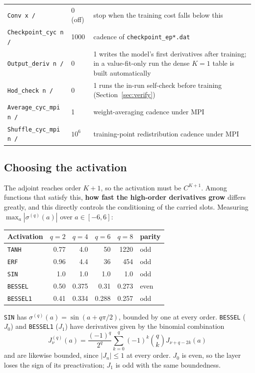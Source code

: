 \documentclass[10pt,a4paper]{article}
\newcommand{\code}[1]{\texttt{#1}}
\begin{document}
\begin{longtable}{@{}p{}p{}p{}@{}}
\code{Conv x /} & 0 (off) & stop when the training cost falls below this\\
\code{Checkpoint\_cyc n /} & 1000 & cadence of \code{checkpoint\_ep*.dat}\\
\code{Output\_deriv n /} & 0 & 1 writes the model's first derivatives after training; in a value-fit-only run the dense $K=1$ table is built automatically\\
\code{Hod\_check n /} & 0 & 1 runs the in-run self-check before training (Section~\ref{sec:verify})\\
\code{Average\_cyc\_mpi n /} & 1 & weight-averaging cadence under MPI\\
\code{Shuffle\_cyc\_mpi n /} & $10^6$ & training-point redistribution cadence under MPI\\
\bottomrule
\end{longtable}

\subsection{Choosing the activation}
\label{sec:activation}

The adjoint reaches order $K+1$, so the activation must be
$C^{K+1}$. Among functions that satisfy this, \textbf{how fast the
high-order derivatives grow} differs greatly, and this directly
controls the conditioning of the carried slots. Measuring
$\max_a|\sigma^{(q)}(a)|$ over $a\in[-6,6]$:

\begin{center}
\begin{tabular}{@{}lrrrrl@{}}
\toprule
Activation & $q=2$ & $q=4$ & $q=6$ & $q=8$ & parity \\
\midrule
\code{TANH}    & 0.77 & 4.0  & 50   & 1220  & odd \\
\code{ERF}     & 0.96 & 4.4  & 36   & 454   & odd \\
\code{SIN}     & 1.0  & 1.0  & 1.0  & 1.0   & odd \\
\code{BESSEL}  & 0.50 & 0.375& 0.31 & 0.273 & even \\
\code{BESSEL1} & 0.41 & 0.334& 0.288& 0.257 & odd \\
\bottomrule
\end{tabular}
\end{center}

\code{SIN} has $\sigma^{(q)}(a)=\sin(a+q\pi/2)$, bounded by one at
every order. \code{BESSEL} ($J_0$) and \code{BESSEL1} ($J_1$) have
derivatives given by the binomial combination
\[
J_\nu^{(q)}(a)=\frac{(-1)^q}{2^q}\sum_{k=0}^{q}(-1)^k\binom{q}{k}J_{\nu+q-2k}(a)
\]
and are likewise bounded, since $|J_n|\le1$ at every order. $J_0$ is
even, so the layer loses the sign of its preactivation; $J_1$ is odd
with the same boundedness.
\end{document}
